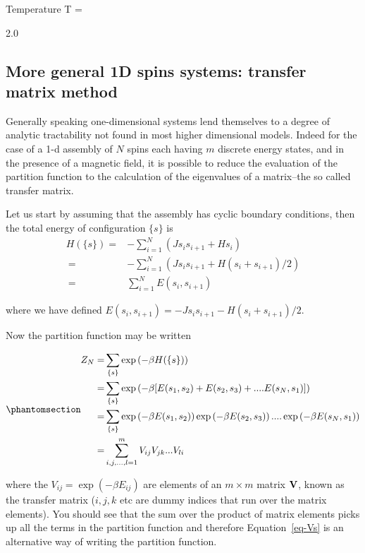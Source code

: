 \documentclass[
  letterpaper,
  enabledeprecatedfontcommands]{report}
\begin{document}
\label{ising}

Temperature T =

2.0

\subsection{More general 1D spins systems: transfer matrix
method}\label{more-general-1d-spins-systems-transfer-matrix-method}

Generally speaking one-dimensional systems lend themselves to a degree
of analytic tractability not found in most higher dimensional models.
Indeed for the case of a 1-d assembly of \(N\) spins each having \(m\)
discrete energy states, and in the presence of a magnetic field, it is
possible to reduce the evaluation of the partition function to the
calculation of the eigenvalues of a matrix--the so called transfer
matrix.

Let us start by assuming that the assembly has cyclic boundary
conditions, then the total energy of configuration \(\{s\}\) is \[
\begin{aligned}
H(\{s\})=&-\sum_{i=1}^N (J s_i s_{i+1}+Hs_i)\\
\:=&-\sum_{i=1}^N (J s_i s_{i+1}+H(s_i+s_{i+1})/2)\\
\:=&\sum_{i=1}^N E(s_i,s_{i+1})
\end{aligned}
\]

where we have defined
\(E(s_i,s_{i+1})=-J s_i s_{i+1}-H(s_i+s_{i+1})/2\).

Now the partition function may be written

\begin{equation}\phantomsection\label{eq-Vs}{\begin{aligned}
Z_N =& \sum_{\{s\}}\exp\left(-\beta H(\{s\})\right)\nonumber \\
 =&\sum_{\{s\}}\exp\left(-\beta[E(s_1,s_2)+E(s_2,s_3)+....E(s_N,s_1)]\right) \nonumber\\
 =&\sum_{\{s\}}\exp\left(-\beta E(s_1,s_2)\right)\exp\left(-\beta E(s_2,s_3)\right)....\exp\left(-\beta E(s_N,s_1)\right) \nonumber\\
=&\sum_{i,j,...,l=1}^m V_{ij}V_{jk}...V_{li} 
\end{aligned}}\end{equation}

where the \(V_{ij}=\exp(-\beta E_{ij})\) are elements of an
\(m \times m\) matrix \({\bf V}\), known as the transfer matrix
(\(i,j,k\) etc are dummy indices that run over the matrix elements). You
should see that the sum over the product of matrix elements picks up all
the terms in the partition function and therefore Equation~\ref{eq-Vs}
is an alternative way of writing the partition function.
\end{document}
